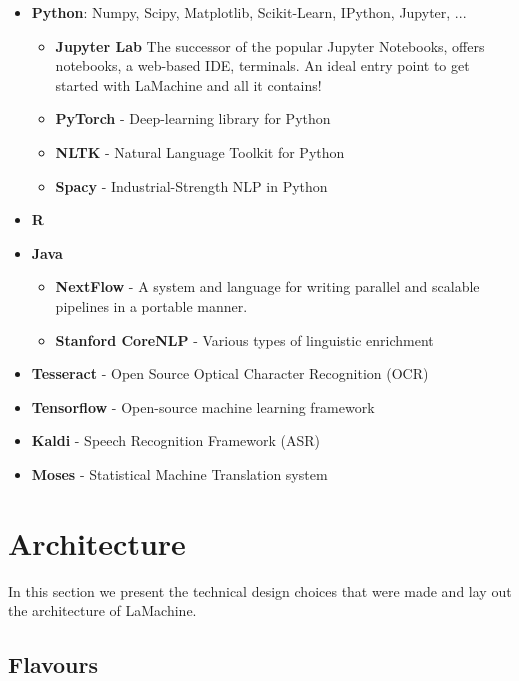 \documentclass[a4paper,11pt]{article}
\begin{document}
\begin{itemize}
    \item \textbf{Python}: Numpy, Scipy, Matplotlib, Scikit-Learn, IPython, Jupyter, ...
    \begin{itemize}
        \item \textbf{Jupyter Lab} The successor of the popular Jupyter Notebooks, offers notebooks, a web-based IDE, terminals. An ideal entry point to get started with LaMachine and all it contains!
        \item \textbf{PyTorch} - Deep-learning library for Python
        \item \textbf{NLTK} - Natural Language Toolkit for Python
        \item \textbf{Spacy} - Industrial-Strength NLP in Python
    \end{itemize}
    \item \textbf{R}
    \item \textbf{Java}
    \begin{itemize}
        \item \textbf{NextFlow} - A system and language for writing parallel and scalable pipelines in a portable manner.
        \item \textbf{Stanford CoreNLP} - Various types of linguistic enrichment
    \end{itemize}
    \item \textbf{Tesseract} - Open Source Optical Character Recognition (OCR)
    \item \textbf{Tensorflow} - Open-source machine learning framework
    \item \textbf{Kaldi} - Speech Recognition Framework (ASR)
    \item \textbf{Moses} - Statistical Machine Translation system
\end{itemize}



\section{Architecture}

In this section we present the technical design choices that were made and lay out the architecture of LaMachine.

\subsection{Flavours}
\end{document}
